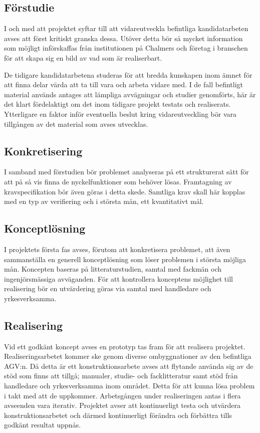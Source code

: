 \documentclass[a4paper,11pt]{article}
\begin{document}
\subsection{Förstudie}
I och med att projektet syftar till att vidareutveckla befintliga
kandidatarbeten avses att först kritiskt granska dessa. Utöver detta bör så
mycket information som möjligt införskaffas från institutionen på Chalmers
och företag i branschen för att skapa sig en bild av vad som är
realiserbart.

De tidigare kandidatarbetena studeras för att bredda kunskapen inom ämnet
för att finna delar värda att ta till vara och arbeta vidare med. I de fall
befintligt material används antages att lämpliga avvägningar och studier
genomförts, här är det klart fördelaktigt om det inom tidigare projekt
testats och realiserats. Ytterligare en faktor inför eventuella beslut
kring vidareutveckling bör vara tillgången av det material som avses
utvecklas.


\subsection{Konkretisering}
I samband med förstudien bör problemet analyseras på ett strukturerat sätt
för att på så vis finna de nyckelfunktioner som behöver lösas. Framtagning
av kravspecifikation bör även göras i detta skede. Samtliga krav skall här
kopplas med en typ av verifiering och i största mån, ett kvantitativt mål.



\subsection{Konceptlösning}
I projektets första fas avses, förutom att konkretisera problemet, att även
sammanställa en generell konceptlösning som löser problemen i största
möjliga mån. Koncepten baseras på litteraturstudien, samtal med fackmän och
ingenjörsmässiga avväganden. För att kontrollera konceptens möjlighet till
realisering bör en utvärdering göras via samtal med handledare och
yrkesverksamma.


\subsection{Realisering}
Vid ett godkänt koncept avses en prototyp tas fram för att realisera
projektet. Realiseringsarbetet kommer ske genom diverse ombyggnationer av
den befintliga AGV:n. Då detta är ett konstruktionsarbete avses att
flytande använda sig av de stöd som finns att tillgå; manualer, studie- och
facklitteratur samt stöd från handledare och yrkesverksamma inom området.
Detta för att kunna lösa problem i takt med att de uppkommer. Arbetsgången
under realiseringen antas i flera avseenden vara iterativ. Projektet avser
att kontinuerligt testa och utvärdera konstruktionsarbetet och därmed
kontinuerligt förändra och förbättra tills godkänt resultat uppnås.
\end{document}

